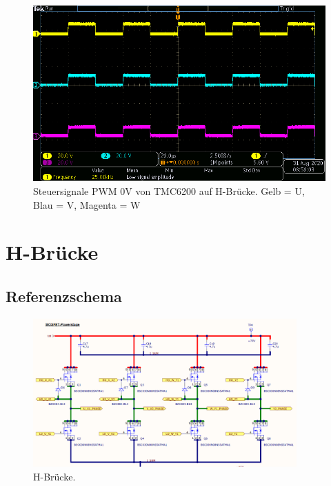 \begin{appendix}
\begin{figure}[h!]
\center
\includegraphics[width = \textwidth]{graphics/TMC6200_Gate_Signal_L}
\caption{Steuersignale PWM 0V von TMC6200 auf H-Brücke. Gelb = U, Blau = V, Magenta = W}
\label{fig:TMC6200_Gate_Signal_L}
\end{figure}

\newpage

\section{H-Brücke}\label{Appendix:H_Bruecke}

\subsection{Referenzschema}

\begin{figure}[h!]
	\centering
	\includegraphics[width=0.9\textwidth]{graphics/Referenzschema_10A70V}
	\caption{H-Brücke.}
	\label{fig:Schema_H_Bruecke_und_BLDC_Ref}
\end{figure}



\end{appendix}
